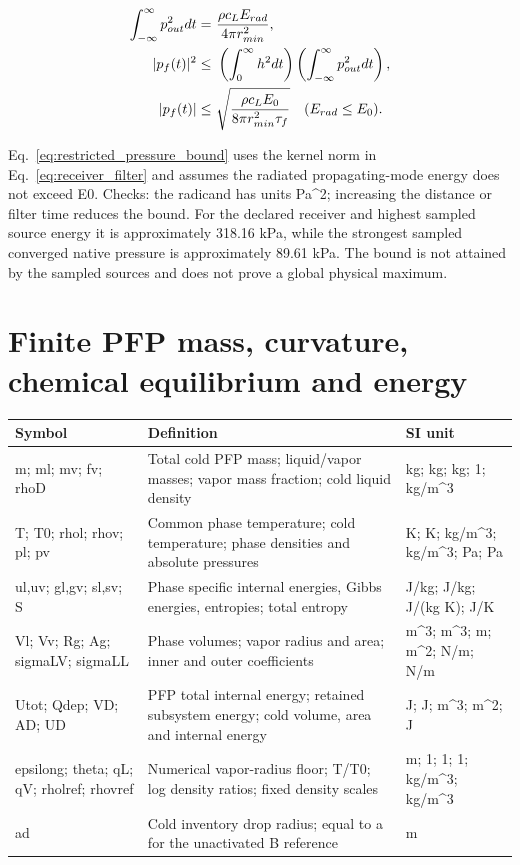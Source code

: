 \documentclass[11pt]{article}
\begin{document}
\begin{align}
\int_{-\infty}^\infty p_{out}^2dt= & ~\frac{\rho c_L E_{rad}}{4\pi r_{min}^2}, \notag \\
|p_f(t)|^2\leq & ~\left(\int_0^\infty h^2dt\right)\left(\int_{-\infty}^\infty p_{out}^2dt\right), \notag \\
|p_f(t)|\leq & ~\sqrt{\frac{\rho c_LE_0}{8\pi r_{min}^2\tau_f}}\quad(E_{rad}\le E_0). \label{eq:restricted_pressure_bound}
\end{align}

Eq.~\eqref{eq:restricted_pressure_bound} uses the kernel norm in Eq.~\eqref{eq:receiver_filter} and assumes the radiated propagating-mode energy does not exceed E0. Checks: the radicand has units Pa\textasciicircum{}2; increasing the distance or filter time reduces the bound. For the declared receiver and highest sampled source energy it is  approximately 318.16 kPa, while the strongest sampled converged native pressure is  approximately 89.61 kPa. The bound is not attained by the sampled sources and does not prove a global physical maximum.

\section{Finite PFP mass, curvature, chemical equilibrium and energy}\label{sec:phase}

\begin{longtable}{p{.18\linewidth}p{.60\linewidth}p{.15\linewidth}}Symbol & Definition & SI unit\\\hline

m; ml; mv; fv; rhoD & Total cold PFP mass; liquid/vapor masses; vapor mass fraction; cold liquid density & kg; kg; kg; 1; kg/m\textasciicircum{}3\\

T; T0; rhol; rhov; pl; pv & Common phase temperature; cold temperature; phase densities and absolute pressures & K; K; kg/m\textasciicircum{}3; kg/m\textasciicircum{}3; Pa; Pa\\

ul,uv; gl,gv; sl,sv; S & Phase specific internal energies, Gibbs energies, entropies; total entropy & J/kg; J/kg; J/(kg K); J/K\\

Vl; Vv; Rg; Ag; sigmaLV; sigmaLL & Phase volumes; vapor radius and area; inner and outer coefficients & m\textasciicircum{}3; m\textasciicircum{}3; m; m\textasciicircum{}2; N/m; N/m\\

Utot; Qdep; VD; AD; UD & PFP total internal energy; retained subsystem energy; cold volume, area and internal energy & J; J; m\textasciicircum{}3; m\textasciicircum{}2; J\\

epsilong; theta; qL; qV; rholref; rhovref & Numerical vapor-radius floor; T/T0; log density ratios; fixed density scales & m; 1; 1; 1; kg/m\textasciicircum{}3; kg/m\textasciicircum{}3\\

ad & Cold inventory drop radius; equal to a for the unactivated B reference & m\\

\end{longtable}
\end{document}
